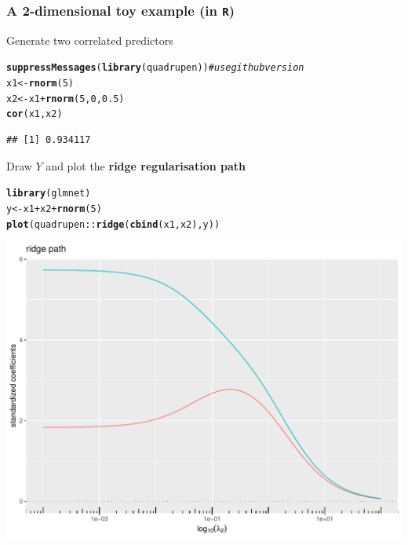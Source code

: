 \documentclass[10pt, c, xcolor=x11names]{beamer}\usepackage[]{graphicx}\usepackage[]{color}
\makeatletter
\newcommand{\hlnum}[1]{\textcolor[rgb]{0.686,0.059,0.569}{#1}}%
\newcommand{\hlcom}[1]{\textcolor[rgb]{0.678,0.584,0.686}{\textit{#1}}}%
\newcommand{\hlopt}[1]{\textcolor[rgb]{0,0,0}{#1}}%
\newcommand{\hlstd}[1]{\textcolor[rgb]{0.345,0.345,0.345}{#1}}%
\newcommand{\hlkwb}[1]{\textcolor[rgb]{0.69,0.353,0.396}{#1}}%
\newcommand{\hlkwd}[1]{\textcolor[rgb]{0.737,0.353,0.396}{\textbf{#1}}}%
\newenvironment{kframe}{%
 \def\at@end@of@kframe{}%
 \ifinner\ifhmode%
  \def\at@end@of@kframe{\end{minipage}}%
  \begin{minipage}{\columnwidth}%
 \fi\fi%
 \def\FrameCommand##1{\hskip\@totalleftmargin \hskip-\fboxsep
 \colorbox{shadecolor}{##1}\hskip-\fboxsep
     \hskip-\linewidth \hskip-\@totalleftmargin \hskip\columnwidth}%
 \MakeFramed {\advance\hsize-\width
   \@totalleftmargin\z@ \linewidth\hsize
   \@setminipage}}%
 {\par\unskip\endMakeFramed%
 \at@end@of@kframe}
\newenvironment{knitrout}{}{} %
\makeatother
\begin{document}
\begin{frame}
  \frametitle{A 2-dimensional toy example (in \texttt{R})}

Generate two correlated predictors
\begin{knitrout}\scriptsize
{}\color{fgcolor}\begin{kframe}
\begin{alltt}
\hlkwd{suppressMessages}\hlstd{(}\hlkwd{library}\hlstd{(quadrupen))} \hlcom{# use github version}
\hlstd{x1} \hlkwb{<-} \hlkwd{rnorm}\hlstd{(}\hlnum{5}\hlstd{)}
\hlstd{x2} \hlkwb{<-} \hlstd{x1} \hlopt{+} \hlkwd{rnorm}\hlstd{(}\hlnum{5}\hlstd{,}\hlnum{0}\hlstd{,} \hlnum{0.5}\hlstd{)}
\hlkwd{cor}\hlstd{(x1,x2)}
\end{alltt}
\begin{verbatim}
## [1] 0.934117
\end{verbatim}
\end{kframe}
\end{knitrout}

Draw $Y$ and plot the  \alert{\bf ridge regularisation path}
\begin{knitrout}\scriptsize
{}\color{fgcolor}\begin{kframe}
\begin{alltt}
\hlkwd{library}\hlstd{(glmnet)}
\hlstd{y} \hlkwb{<-} \hlstd{x1} \hlopt{+} \hlstd{x2} \hlopt{+}\hlkwd{rnorm}\hlstd{(}\hlnum{5}\hlstd{)}
\hlkwd{plot}\hlstd{(quadrupen}\hlopt{::}\hlkwd{ridge}\hlstd{(}\hlkwd{cbind}\hlstd{(x1,x2),y))}
\end{alltt}
\end{kframe}
\includegraphics[width=.8\textwidth]{figures/toy_ridgeunnamed-chunk-18-1} 

\end{knitrout}

\end{frame}
\end{document}
